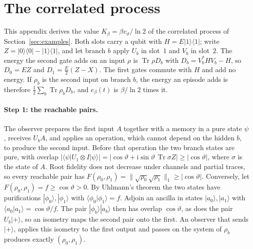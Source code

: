 \documentclass[11pt]{article}
\theoremstyle{definition}
\theoremstyle{remark}
\newcommand{\Tr}{\operatorname{Tr}}
\newcommand{\Kb}{K_\beta}
\begin{document}
\section{The correlated process}\label{app:hidden}

This appendix derives the value $\Kb=\beta v_\vartheta/\ln2$ of the correlated process of Section~\ref{sec:examples}. Both slots carry a qubit with $H=E|1\rangle\langle1|$; write $Z=|0\rangle\langle0|-|1\rangle\langle1|$, and let branch $b$ apply $U_b$ in slot~$1$ and $V_b$ in slot~$2$. The energy the second gate adds on an input $\rho$ is $\Tr\rho D_b$ with $D_b=V_b^*HV_b-H$, so $D_0=EZ$ and $D_1=\tfrac E2(Z-X)$. The first gates commute with $H$ and add no energy. If $\rho_b$ is the second input on branch $b$, the energy an episode adds is therefore $\tfrac12\sum_b\Tr\rho_bD_b$, and $e_\beta(t)$ is $\beta/\ln2$ times it.

\paragraph{Step 1: the reachable pairs.} The observer prepares the first input $A$ together with a memory in a pure state $\psi$, receives $U_bA$, and applies an operation, which cannot depend on the hidden $b$, to produce the second input. Before that operation the two branch states are pure, with overlap $|\langle\psi|U_1\otimes I|\psi\rangle|=|\cos\vartheta+\mathrm i\sin\vartheta\,\Tr\sigma Z|\ge|\cos\vartheta|$, where $\sigma$ is the state of $A$. Root fidelity does not decrease under channels and partial traces, so every reachable pair has $F(\rho_0,\rho_1)=\|\sqrt{\rho_0}\sqrt{\rho_1}\|_1\ge|\cos\vartheta|$. Conversely, let $F(\rho_0,\rho_1)=f\ge\cos\vartheta>0$. By Uhlmann's theorem the two states have purifications $|\phi_0\rangle,|\phi_1\rangle$ with $\langle\phi_0|\phi_1\rangle=f$. Adjoin an ancilla in states $|a_0\rangle,|a_1\rangle$ with $\langle a_0|a_1\rangle=\cos\vartheta/f$. The pair $|\phi_b\rangle|a_b\rangle$ then has overlap $\cos\vartheta$, as does the pair $U_b|+\rangle$, so an isometry maps the second pair onto the first. An observer that sends $|+\rangle$, applies this isometry to the first output and passes on the system of $\rho_b$ produces exactly $(\rho_0,\rho_1)$.
\end{document}
